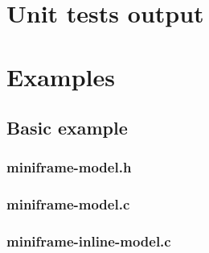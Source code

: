 \begin{scriptsize}
\begin{ttfamily}

\end{ttfamily}
\end{scriptsize}

\section{Unit tests output}

\begin{scriptsize}
\begin{ttfamily}

\end{ttfamily}
\end{scriptsize}

\section{Examples}

\subsection{Basic example}

\subsubsection{miniframe-model.h}

\begin{scriptsize}
\begin{ttfamily}

\end{ttfamily}
\end{scriptsize}

\subsubsection{miniframe-model.c}

\begin{scriptsize}
\begin{ttfamily}

\end{ttfamily}
\end{scriptsize}

\subsubsection{miniframe-inline-model.c}

